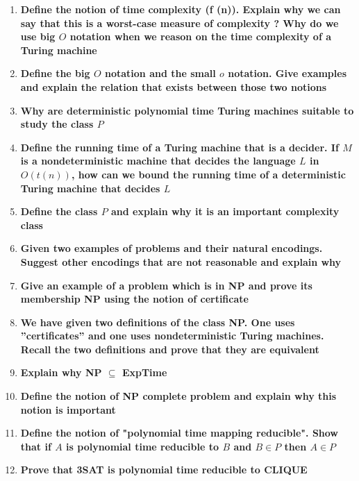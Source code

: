 \documentclass{article}
\begin{document}
\begin{enumerate}{}

\item \textbf{Define the notion of time complexity (f (n)). Explain why we can say that this is a worst-case measure of complexity ? Why do we use big $O$ notation when we reason on the time complexity of a Turing machine}

\item \textbf{Define the big $O$ notation and the small $o$ notation. Give examples and explain the relation that exists between those two notions}

\item \textbf{Why are deterministic polynomial time Turing machines suitable to study the class $P$}

\item \textbf{Define the running time of a Turing machine that is a decider. If $M$ is a nondeterministic machine that decides the language $L$ in $O(t(n))$, how can we bound the running time of a deterministic Turing machine that decides $L$}

\item \textbf{Define the class $P$ and explain why it is an important complexity class}

\item \textbf{Given two examples of problems and their natural encodings. Suggest other encodings that are not reasonable and explain why}

\item \textbf{Give an example of a problem which is in NP and prove its membership NP using the notion of certificate}

\item \textbf{We have given two definitions of the class NP. One uses ”certificates” and one uses nondeterministic Turing machines. Recall the two definitions and prove that they are equivalent}

\item \textbf{Explain why NP $\subseteq$ ExpTime}

\item \textbf{Define the notion of NP complete problem and explain why this notion is important}

\item \textbf{Define the notion of "polynomial time mapping reducible". Show that if $A$ is polynomial time reducible to $B$ and $B \in P$ then $A \in P$}

\item \textbf{Prove that 3SAT is polynomial time reducible to CLIQUE}


\end{enumerate}
\end{document}
